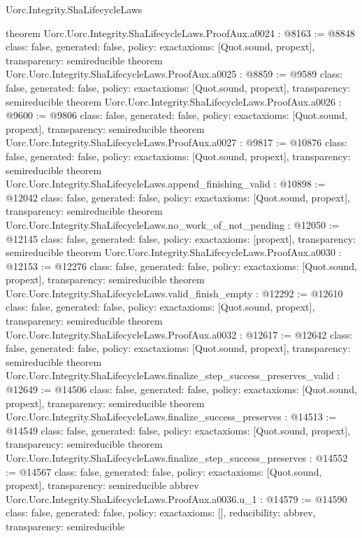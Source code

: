 \begin{lexlean}{Uorc.Integrity.ShaLifecycleLaws}
\begin{coremodule}
{}
theorem Uorc.Uorc.Integrity.ShaLifecycleLaws.ProofAux.a0024 : @8163 := @8848 {
  class: false,
  generated: false,
  policy: exact{axioms: [Quot.sound, propext]},
  transparency: semireducible
}
theorem Uorc.Uorc.Integrity.ShaLifecycleLaws.ProofAux.a0025 : @8859 := @9589 {
  class: false,
  generated: false,
  policy: exact{axioms: [Quot.sound, propext]},
  transparency: semireducible
}
theorem Uorc.Uorc.Integrity.ShaLifecycleLaws.ProofAux.a0026 : @9600 := @9806 {
  class: false,
  generated: false,
  policy: exact{axioms: [Quot.sound, propext]},
  transparency: semireducible
}
theorem Uorc.Uorc.Integrity.ShaLifecycleLaws.ProofAux.a0027 : @9817 := @10876 {
  class: false,
  generated: false,
  policy: exact{axioms: [Quot.sound, propext]},
  transparency: semireducible
}
theorem Uorc.Uorc.Integrity.ShaLifecycleLaws.append_finishing_valid : @10898 := @12042 {
  class: false,
  generated: false,
  policy: exact{axioms: [Quot.sound, propext]},
  transparency: semireducible
}
theorem Uorc.Uorc.Integrity.ShaLifecycleLaws.no_work_of_not_pending : @12050 := @12145 {
  class: false,
  generated: false,
  policy: exact{axioms: [propext]},
  transparency: semireducible
}
theorem Uorc.Uorc.Integrity.ShaLifecycleLaws.ProofAux.a0030 : @12153 := @12276 {
  class: false,
  generated: false,
  policy: exact{axioms: [Quot.sound, propext]},
  transparency: semireducible
}
theorem Uorc.Uorc.Integrity.ShaLifecycleLaws.valid_finish_empty : @12292 := @12610 {
  class: false,
  generated: false,
  policy: exact{axioms: [Quot.sound, propext]},
  transparency: semireducible
}
theorem Uorc.Uorc.Integrity.ShaLifecycleLaws.ProofAux.a0032 : @12617 := @12642 {
  class: false,
  generated: false,
  policy: exact{axioms: [Quot.sound, propext]},
  transparency: semireducible
}
theorem Uorc.Uorc.Integrity.ShaLifecycleLaws.finalize_step_success_preserves_valid : @12649 := @14506 {
  class: false,
  generated: false,
  policy: exact{axioms: [Quot.sound, propext]},
  transparency: semireducible
}
theorem Uorc.Uorc.Integrity.ShaLifecycleLaws.finalize_success_preserves : @14513 := @14549 {
  class: false,
  generated: false,
  policy: exact{axioms: [Quot.sound, propext]},
  transparency: semireducible
}
theorem Uorc.Uorc.Integrity.ShaLifecycleLaws.finalize_step_success_preserves : @14552 := @14567 {
  class: false,
  generated: false,
  policy: exact{axioms: [Quot.sound, propext]},
  transparency: semireducible
}
abbrev Uorc.Uorc.Integrity.ShaLifecycleLaws.ProofAux.a0036.{u_1} : @14579 := @14590 {
  class: false,
  generated: false,
  policy: exact{axioms: []},
  reducibility: abbrev{},
  transparency: semireducible
}
\end{coremodule}
\end{lexlean}
